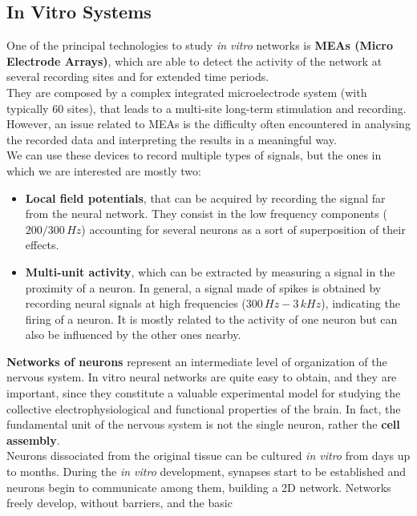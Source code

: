 \subsection{In Vitro Systems}
One of the principal technologies to study \textit{in vitro} networks is
\textbf{MEAs (Micro Electrode Arrays)}, which are able to detect the
activity of the network at several recording sites and for extended time
periods.\\
They are composed by a complex integrated microelectrode system (with
typically 60 sites), that leads to a multi-site long-term stimulation and
recording.
However, an issue related to MEAs is the difficulty often encountered in
analysing the recorded data
and interpreting the results in a meaningful way.\\
We can use these devices to record multiple types of signals, but the ones
in which we are interested are mostly two:
\begin{itemize}
      \item \textbf{Local field potentials}, that can be acquired by
            recording the signal far from the neural network. They consist in the low
            frequency components (\(200/300\,Hz\)) accounting for several neurons as a sort
            of superposition of their effects.
      \item \textbf{Multi-unit activity}, which can be extracted by
            measuring a signal in the proximity of a neuron.  In general, a signal made
            of spikes is obtained by recording neural signals at high frequencies
            (\(300\,Hz-3\,kHz\)), indicating the firing of a neuron. It is mostly related to the
            activity of one neuron but can also be influenced by the other ones
            nearby.
\end{itemize}
\textbf{Networks of neurons} represent an intermediate level of
organization of the nervous system.
In vitro neural networks are quite easy to obtain, and they are important,
since they constitute a valuable experimental model for studying the
collective electrophysiological and functional properties of the brain. In
fact, the fundamental unit of the nervous system is not the single neuron,
rather the \textbf{cell assembly}.\\
Neurons dissociated from the original tissue can be cultured \textit{in vitro} from
days up to months. During the \textit{in vitro} development, synapses start to be
established and neurons begin to communicate among them, building a 2D
network. Networks freely develop, without barriers, and the basic
